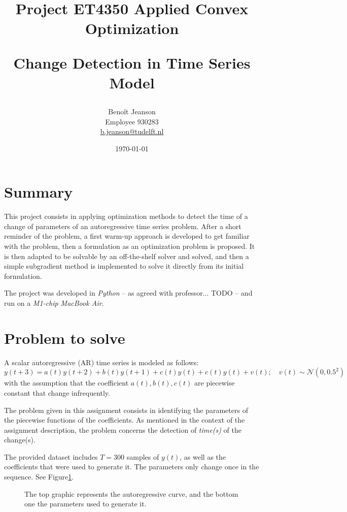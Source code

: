 \documentclass[11pt]{article}
\title{Project ET4350 Applied Convex Optimization

Change Detection in Time Series Model}
\author{Benoît Jeanson \\ Employee 930283 \\ \href{mailto:b.jeanson@tudelft.nl}{b.jeanson@tudelft.nl}}
\date{\today}
\begin{document}
\maketitle
\pagebreak



\section{Summary}
    This project consists in applying optimization methods to detect the time of a change of parameters of an autoregressive time series problem. After a short reminder of the problem, a first warm-up approach is developed to get familiar with the problem, then a formulation as an optimization problem is proposed. It is then adapted to be solvable by an off-the-shelf solver and solved, and then a simple subgradient method is implemented to solve it directly from its initial formulation.
    
    The project was developed in \emph{Python} -- as agreed with professor... TODO -- and run on a \emph{M1-chip MacBook Air}.

\section{Problem to solve}
    A scalar autoregressive (AR) time series is modeled as follows:
    $$y(t+3) = a(t)y(t+2) + b(t)y(t+1) + c(t)y(t) + c(t)y(t) + v(t); \quad v(t) \sim \mathcal{N}(0,0.5^2)$$
    with the assumption that the coefficient $a(t), b(t), c(t)$ are piecewise constant that change infrequently.

    The problem given in this assignment consists in identifying the parameters of the piecewise functions of the coefficients. As mentioned in the context of the assignment description, the problem concerns the detection of \emph{time(s)} of the change(s).

    The provided dataset includes $T=300$ samples of $y(t)$, as well as the coefficients that were used to generate it. The parameters only change once in the sequence. See Figure\ref{fig:dataset}.

    \begin{figure}[h]
        \centering
        
        \caption{\label{fig:dataset} The top graphic represents the autoregressive curve, and the bottom one the parameters used to generate it.}
    \end{figure}
\end{document}
